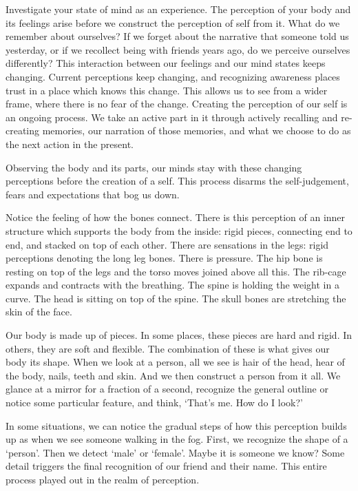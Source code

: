\clearpage


Investigate your state of mind as an experience. The perception of your
body and its feelings arise before we construct the perception of self
from it. What do we remember about ourselves? If we forget about the
narrative that someone told us yesterday, or if we recollect being with
friends years ago, do we perceive ourselves differently? This
interaction between our feelings and our mind states keeps changing.
Current perceptions keep changing, and recognizing awareness places
trust in a place which knows this change. This allows us to see from a
wider frame, where there is no fear of the change. Creating the
perception of our self is an ongoing process. We take an active part in
it through actively recalling and re-creating memories, our narration of
those memories, and what we choose to do as the next action in the
present.


Observing the body and its parts, our minds stay with these changing
perceptions before the creation of a self. This process disarms the
self-judgement, fears and expectations that bog us down.

Notice the feeling of how the bones connect. There is this perception of
an inner structure which supports the body from the inside: rigid
pieces, connecting end to end, and stacked on top of each other. There
are sensations in the legs: rigid perceptions denoting the long leg
bones. There is pressure. The hip bone is resting on top of the legs and
the torso moves joined above all this. The rib-cage expands and
contracts with the breathing. The spine is holding the weight in a
curve. The head is sitting on top of the spine. The skull bones are
stretching the skin of the face.

Our body is made up of pieces. In some places, these pieces are hard and
rigid. In others, they are soft and flexible. The combination of these
is what gives our body its shape. When we look at a person, all we see
is hair of the head, hear of the body, nails, teeth and skin. And we
then construct a person from it all. We glance at a mirror for a
fraction of a second, recognize the general outline or notice some
particular feature, and think, `That's me. How do I look?'

In some situations, we can notice the gradual steps of how this
perception builds up as when we see someone walking in the fog. First,
we recognize the shape of a `person'. Then we detect `male' or `female'.
Maybe it is someone we know? Some detail triggers the final recognition
of our friend and their name. This entire process played out in the
realm of perception.

